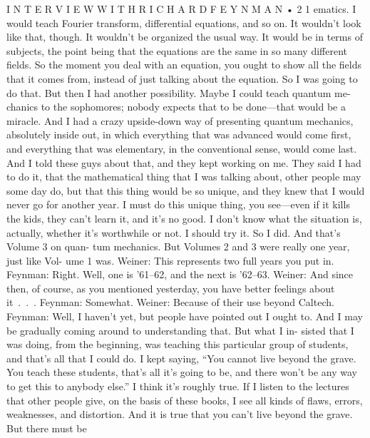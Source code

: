 \documentclass[11pt,oneside]{article}
\begin{document}
I N T E R V I E W  W I T H  R I C H A R D  F E Y N M A N • 2 1 ematics. I would teach Fourier transform, differential equations, and so on. It wouldn’t look like that, though. It wouldn’t be organized the usual way. It would be in terms of subjects, the point being that the equations are the same in so many different fields. So the moment you deal with an equation, you ought to show all the fields that it comes from, instead of just talking about the equation. So I was going to do that. But then I had another possibility. Maybe I could teach quantum me- chanics to the sophomores; nobody expects that to be done---that would be a miracle. And I had a crazy upside-down way of presenting quantum mechanics, absolutely inside out, in which everything that was advanced would come first, and everything that was elementary, in the conventional sense, would come last. And I told these guys about that, and they kept working on me. They said I had to do it, that the mathematical thing that I was talking about, other people may some day do, but that this thing would be so unique, and they knew that I would never go for another year. I must do this unique thing, you see---even if it kills the kids, they can’t learn it, and it’s no good. I don’t know what the situation is, actually, whether it’s worthwhile or not. I should try it. So I did. And that’s Volume 3 on quan- tum mechanics. But Volumes 2 and 3 were really one year, just like Vol- ume 1 was. Weiner: This represents two full years you put in. Feynman: Right. Well, one is ’61–62, and the next is ’62–63. Weiner: And since then, of course, as you mentioned yesterday, you have better feelings about it . . . Feynman: Somewhat. Weiner: Because of their use beyond Caltech. Feynman: Well, I haven’t yet, but people have pointed out I ought to. And I may be gradually coming around to understanding that. But what I in- sisted that I was doing, from the beginning, was teaching this particular group of students, and that’s all that I could do. I kept saying, “You cannot live beyond the grave. You teach these students, that’s all it’s going to be, and there won’t be any way to get this to anybody else.” I think it’s roughly true. If I listen to the lectures that other people give, on the basis of these books, I see all kinds of flaws, errors, weaknesses, and distortion. And it is true that you can’t live beyond the grave. But there must be\par
\end{document}
